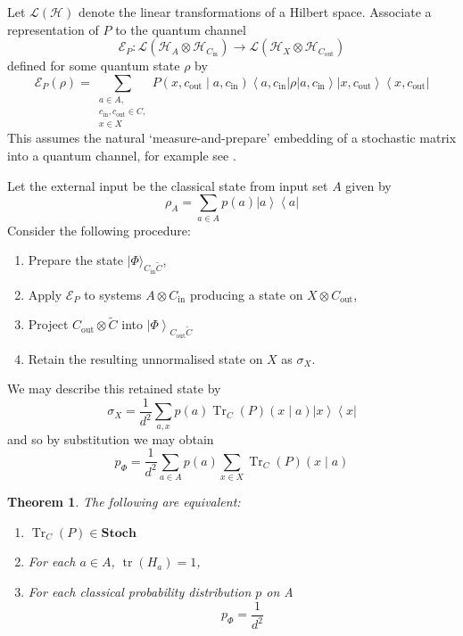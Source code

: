\documentclass[10pt, a4paper]{article}
\newcommand{\bra}[1]{\left\langle{#1}\right|}
\newcommand{\ket}[1]{\left|{#1}\right\rangle}
\newcommand{\Tr}[0]{\operatorname{Tr}}
\newcommand{\tr}[0]{\operatorname{tr}}
\newcommand{\HCin}[0]{\mathcal{H}_{C_{\mathrm{in}}}}
\newcommand{\HCout}[0]{\mathcal{H}_{C_{\mathrm{out}}}}
\newtheorem{theorem}{Theorem}
\begin{document}
Let $\mathcal{L}(\mathcal{H})$ denote the linear transformations of a Hilbert space. Associate a representation of $P$ to the quantum channel $$ \mathcal{E}_P : \mathcal{L}(\mathcal{H}_A \otimes \HCin) \to \mathcal{L}(\mathcal{H}_X \otimes \HCout) $$ defined for some quantum state $\rho$ by
\begin{equation}\label{eq:E_P}
    \mathcal{E}_P(\rho) = \sum_{\substack{a \in A , \\ c_{\mathrm{in}}, c_{\mathrm{out}} \in C, \\ x \in X}} P(x,c_{\mathrm{out}} \mid a,c_{\mathrm{in}}) \bra{a,c_{\mathrm{in}}} \rho \ket{a,c_{\mathrm{in}}} \ket{x, c_{\mathrm{out}}} \bra{ x,c_{\mathrm{out}} }
\end{equation} This assumes the natural `measure-and-prepare' embedding of a stochastic matrix into a quantum channel, for example see \cite{horodecki2003}.

Let the external input be the classical state from input set $A$ given by 
\begin{equation}\label{eq:rhoA}
    \rho_A = \sum_{a \in A} p(a) \ket{a}\bra{a}
\end{equation} Consider the following procedure: 
\begin{enumerate}
    \item Prepare the state $|\Phi\rangle_{C_{\mathrm{in}}\widetilde{C}}$,
    \item Apply $\mathcal{E}_P$ to systems $A \otimes C_{\mathrm{in}}$ producing a state on $X \otimes C_{\mathrm{out}}$, %
    \item Project $C_{\mathrm{out}} \otimes \widetilde{C}$ into $\ket{\Phi}_{C_{\mathrm{out}} \widetilde{C}}$
    \item Retain the resulting unnormalised state on $X$ as $\sigma_X$.
\end{enumerate}

We may describe this retained state by $$ \sigma_X = \frac{1}{d^2} \sum_{a,x} p(a) \Tr_C(P)(x \mid a) \ket{x}\bra{x} $$ and so by substitution we may obtain $$ p_\Phi = \frac{1}{d^2} \sum_{a \in A} p(a) \sum_{x \in X} \Tr_C(P)(x \mid a) $$

\begin{theorem}\label{thm:quantumTFAE}
    The following are equivalent:
    \begin{enumerate}
        \item $\Tr_C(P) \in \mathbf{Stoch}$
        \item For each $a \in A$, $\tr(H_a) = 1$,
        \item For each classical probability distribution $p$ on A $$ p_\Phi = \frac{1}{d^2} $$
    \end{enumerate}
\end{theorem}
\end{document}
